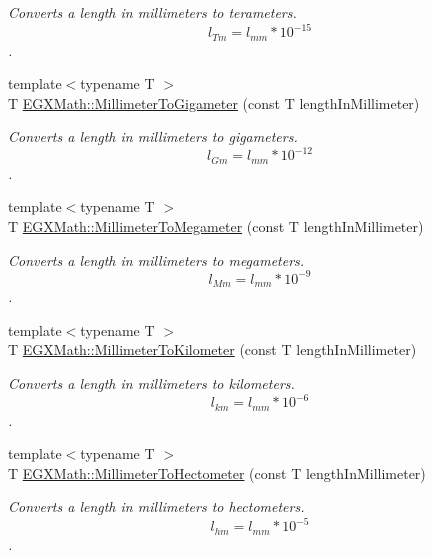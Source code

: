 \begin{DoxyCompactItemize}
\begin{DoxyCompactList}\small\item\em Converts a length in millimeters to terameters. \[ l_{Tm}=l_{mm} * 10^{-15} \]. \end{DoxyCompactList}\item 
{\footnotesize template$<$typename T $>$ }\\T \mbox{\hyperlink{group___e_g_x_math-_conversions-_length_conversions-_s_i-_millimeter-_s_i_gaeadd93f73f66f5b904919def3d44e858}{E\+G\+X\+Math\+::\+Millimeter\+To\+Gigameter}} (const T length\+In\+Millimeter)
\begin{DoxyCompactList}\small\item\em Converts a length in millimeters to gigameters. \[ l_{Gm}=l_{mm} * 10^{-12} \]. \end{DoxyCompactList}\item 
{\footnotesize template$<$typename T $>$ }\\T \mbox{\hyperlink{group___e_g_x_math-_conversions-_length_conversions-_s_i-_millimeter-_s_i_ga2e4c24dcd2559aebefe78e13fbd0e394}{E\+G\+X\+Math\+::\+Millimeter\+To\+Megameter}} (const T length\+In\+Millimeter)
\begin{DoxyCompactList}\small\item\em Converts a length in millimeters to megameters. \[ l_{Mm}=l_{mm} * 10^{-9} \]. \end{DoxyCompactList}\item 
{\footnotesize template$<$typename T $>$ }\\T \mbox{\hyperlink{group___e_g_x_math-_conversions-_length_conversions-_s_i-_millimeter-_s_i_ga1c5b03f2d0745187350584f77f406f13}{E\+G\+X\+Math\+::\+Millimeter\+To\+Kilometer}} (const T length\+In\+Millimeter)
\begin{DoxyCompactList}\small\item\em Converts a length in millimeters to kilometers. \[ l_{km}=l_{mm} * 10^{-6} \]. \end{DoxyCompactList}\item 
{\footnotesize template$<$typename T $>$ }\\T \mbox{\hyperlink{group___e_g_x_math-_conversions-_length_conversions-_s_i-_millimeter-_s_i_gaa4a0a12379c507ce0ffb4a950174980c}{E\+G\+X\+Math\+::\+Millimeter\+To\+Hectometer}} (const T length\+In\+Millimeter)
\begin{DoxyCompactList}\small\item\em Converts a length in millimeters to hectometers. \[ l_{hm}=l_{mm} * 10^{-5} \]. \end{DoxyCompactList}\item 

\end{DoxyCompactItemize}
